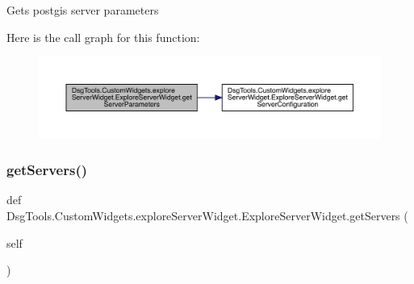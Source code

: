 \begin{DoxyVerb}Gets postgis server parameters
\end{DoxyVerb}
 Here is the call graph for this function\+:
\nopagebreak
\begin{figure}[H]
\begin{center}
\leavevmode
\includegraphics[width=350pt]{class_dsg_tools_1_1_custom_widgets_1_1explore_server_widget_1_1_explore_server_widget_a701ec96fe40f3535ab4c9df4bdaec972_cgraph}
\end{center}
\end{figure}
\mbox{\label{class_dsg_tools_1_1_custom_widgets_1_1explore_server_widget_1_1_explore_server_widget_a637e196dd18e352d8635b217dc8b75bf}} 
\subsubsection{\texorpdfstring{get\+Servers()}{getServers()}}
{\footnotesize\ttfamily def Dsg\+Tools.\+Custom\+Widgets.\+explore\+Server\+Widget.\+Explore\+Server\+Widget.\+get\+Servers (\begin{DoxyParamCaption}\item[{}]{self }\end{DoxyParamCaption})}

